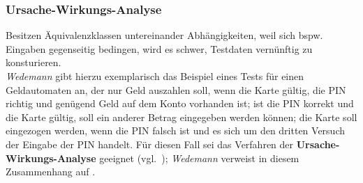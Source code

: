 \subsubsection*{Ursache-Wirkungs-Analyse}
Besitzen Äquivalenzklassen untereinander Abhängigkeiten, weil sich bspw. Eingaben gegenseitig bedingen, wird es schwer, Testdaten vernünftig zu konsturieren.\\
\textit{Wedemann} gibt hierzu exemplarisch das Beispiel eines Tests für einen Geldautomaten an, der nur Geld auszahlen soll, wenn die Karte gültig, die PIN richtig und genügend Geld auf dem Konto vorhanden ist; ist die PIN korrekt und die Karte gültig, soll ein anderer Betrag eingegeben werden können; die Karte soll eingezogen werden, wenn die PIN falsch ist und es sich um den dritten Versuch der Eingabe der PIN handelt. Für diesen Fall sei das Verfahren der \textbf{Ursache-Wirkungs-Analyse} geeignet (vgl.~\cite[46]{Wed09c}); \textit{Wedemann} verweist in diesem Zusammenhang auf \cite{ST05}.